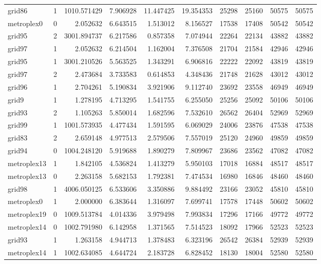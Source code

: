 \begin{longtable}{|l|r|r|r|r|r|r|r|r|r|}
grid86 & 1 & 1010.571429 & 7.906928 & 11.447425 & 19.354353 & 25298 & 25160 & 50575 & 50575 \\
metroplex0 & 0 & 2.052632 & 6.643515 & 1.513012 & 8.156527 & 17538 & 17408 & 50542 & 50542 \\
grid95 & 2 & 3001.894737 & 6.217586 & 0.857358 & 7.074944 & 22264 & 22134 & 43882 & 43882 \\
grid97 & 1 & 2.052632 & 6.214504 & 1.162004 & 7.376508 & 21704 & 21584 & 42946 & 42946 \\
grid95 & 1 & 3001.210526 & 5.563525 & 1.343291 & 6.906816 & 22222 & 22092 & 43819 & 43819 \\
grid97 & 2 & 2.473684 & 3.733583 & 0.614853 & 4.348436 & 21748 & 21628 & 43012 & 43012 \\
grid96 & 1 & 2.704261 & 5.190834 & 3.921906 & 9.112740 & 23692 & 23558 & 46949 & 46949 \\
grid9 & 1 & 1.278195 & 4.713295 & 1.541755 & 6.255050 & 25256 & 25092 & 50106 & 50106 \\
grid93 & 2 & 1.105263 & 5.850014 & 1.682596 & 7.532610 & 26562 & 26404 & 52969 & 52969 \\
grid99 & 1 & 1001.573935 & 4.477434 & 1.591595 & 6.069029 & 24006 & 23876 & 47538 & 47538 \\
grid83 & 2 & 2.659148 & 4.977513 & 2.579506 & 7.557019 & 25120 & 24960 & 49859 & 49859 \\
grid94 & 0 & 1004.248120 & 5.919688 & 1.890279 & 7.809967 & 23686 & 23562 & 47082 & 47082 \\
metroplex13 & 1 & 1.842105 & 4.536824 & 1.413279 & 5.950103 & 17018 & 16884 & 48517 & 48517 \\
metroplex13 & 0 & 2.263158 & 5.682153 & 1.792381 & 7.474534 & 16980 & 16846 & 48460 & 48460 \\
grid98 & 1 & 4006.050125 & 6.533606 & 3.350886 & 9.884492 & 23166 & 23052 & 45810 & 45810 \\
metroplex0 & 1 & 2.000000 & 6.383644 & 1.316097 & 7.699741 & 17578 & 17448 & 50602 & 50602 \\
metroplex19 & 0 & 1009.513784 & 4.014336 & 3.979498 & 7.993834 & 17296 & 17166 & 49772 & 49772 \\
metroplex14 & 0 & 1002.791980 & 6.142958 & 1.371565 & 7.514523 & 18092 & 17966 & 52523 & 52523 \\
grid93 & 1 & 1.263158 & 4.944713 & 1.378483 & 6.323196 & 26542 & 26384 & 52939 & 52939 \\
metroplex14 & 1 & 1002.634085 & 4.644724 & 2.183728 & 6.828452 & 18130 & 18004 & 52580 & 52580 \\

\end{longtable}
